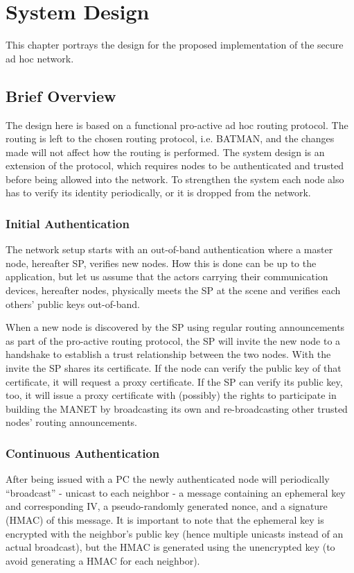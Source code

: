 \chapter{System Design}
\label{ch:design}
\acresetall

This chapter portrays the design for the proposed implementation of the secure
ad hoc network.

\section{Brief Overview}
The design here is based on a functional pro-active ad hoc routing protocol.
The routing is left to the chosen routing protocol, i.e. \ac{BATMAN}, and the
changes made will not affect how the routing is performed. The system design is
an extension of the protocol, which requires nodes to be authenticated and
trusted before being allowed into the network. To strengthen the system each
node also has to verify its identity periodically, or it is dropped from the
network.


\subsection{Initial Authentication}
The network setup starts with an out-of-band authentication where a master node,
hereafter \ac{SP}, verifies new nodes. How this is done can be up to the
application, but let us assume that the actors carrying their communication
devices, hereafter nodes, physically meets the \ac{SP} at the scene and verifies
each others' public keys out-of-band.

When a new node is discovered by the \ac{SP} using regular routing announcements
as part of the pro-active routing protocol, the \ac{SP} will invite the new node
to a handshake to establish a trust relationship between the two nodes. With the
invite the \ac{SP} shares its certificate. If the node can verify the public key
of that certificate, it will request a proxy certificate. If the \ac{SP} can
verify its public key, too, it will issue a proxy certificate with (possibly)
the rights to participate in building the \ac{MANET} by broadcasting its own
and re-broadcasting other trusted nodes' routing announcements.

\subsection{Continuous Authentication}
After being issued with a \ac{PC} the newly authenticated node will periodically
``broadcast'' - unicast to each neighbor - a message containing an ephemeral key
and corresponding \ac{IV}, a pseudo-randomly generated nonce, and a signature (HMAC)
of this message. It is important to note that the ephemeral key is encrypted
with the neighbor's public key (hence multiple unicasts instead of an actual
broadcast), but the HMAC is generated using the unencrypted key (to avoid
generating a HMAC for each neighbor).

